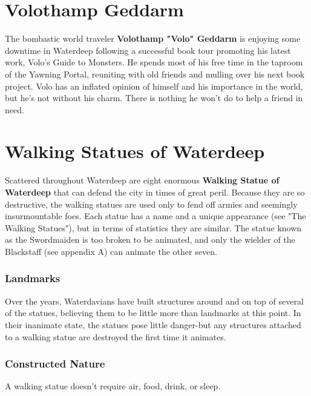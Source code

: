 \documentclass[10pt,a4paper,twoside,twocolumn,openany,nodeprecatedcode]{dndbook}
\begin{document}
\section{Volothamp Geddarm}
The bombastic world traveler \textbf{Volothamp "Volo" Geddarm} is enjoying some downtime in Waterdeep following a successful book tour promoting his latest work, Volo's Guide to Monsters. He spends most of his free time in the taproom of the Yawning Portal, reuniting with old friends and mulling over his next book project.
Volo has an inflated opinion of himself and his importance in the world, but he's not without his charm. There is nothing he won't do to help a friend in need.
\section{Walking Statues of Waterdeep}
Scattered throughout Waterdeep are eight enormous \textbf{Walking Statue of Waterdeep} that can defend the city in times of great peril. Because they are so destructive, the walking statues are used only to fend off armies and seemingly insurmountable foes.
Each statue has a name and a unique appearance (see "The Walking Statues"), but in terms of statistics they are similar. The statue known as the Swordmaiden is too broken to be animated, and only the wielder of the Blackstaff (see appendix A) can animate the other seven.
\subsubsection{Landmarks}
Over the years, Waterdavians have built structures around and on top of several of the statues, believing them to be little more than landmarks at this point. In their inanimate state, the statues pose little danger-but any structures attached to a walking statue are destroyed the first time it animates.
\subsubsection{Constructed Nature}
A walking statue doesn't require air, food, drink, or sleep.
\end{document}
